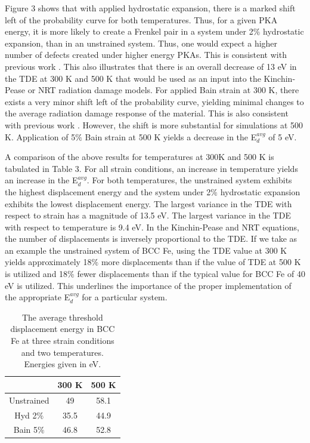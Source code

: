 \documentclass[review]{elsarticle}
\begin{document}
Figure 3 shows that with applied hydrostatic expansion, there is a marked shift left of the probability curve for both temperatures.  Thus, for a given PKA energy, it is more likely to create a Frenkel pair in a system under 2$\%$ hydrostatic expansion, than in an unstrained system.  Thus, one would expect a higher number of defects created under higher energy PKAs.  This is consistent with previous work \cite{beeler2015}.  This also illustrates that there is an overall decrease of 13 eV in the TDE at 300 K and 500 K that would be used as an input into the Kinchin-Pease or NRT radiation damage models.  For applied Bain strain at 300 K, there exists a very minor shift left of the probability curve, yielding minimal changes to the average radiation damage response of the material.  This is also consistent with previous work \cite{beeler2015}.  However, the shift is more substantial for simulations at 500 K.  Application of 5$\%$ Bain strain at 500 K yields a decrease in the E$^{avg}_{d}$ of 5 eV.

\FloatBarrier

A comparison of the above results for temperatures at 300K and 500 K is tabulated in Table 3.  For all strain conditions, an increase in temperature yields an increase in the E$^{avg}_{d}$.  For both temperatures, the unstrained system exhibits the highest displacement energy and the system under 2$\%$ hydrostatic expansion exhibits the lowest displacement energy.  The largest variance in the TDE with respect to strain has a magnitude of 13.5 eV.  The largest variance in the TDE with respect to temperature is 9.4 eV.  In the Kinchin-Pease and NRT equations, the number of displacements is inversely proportional to the TDE.  If we take as an example the unstrained system of BCC Fe, using the TDE value at 300 K yields approximately 18$\%$ more displacements than if the value of TDE at 500 K is utilized and 18$\%$ fewer displacements than if the typical value for BCC Fe of 40 eV is utilized.  This underlines the importance of the proper implementation of the appropriate E$^{avg}_{d}$ for a particular system.  

\begin{table}[htbp]
\caption{The average threshold displacement energy in BCC Fe at three strain conditions and two temperatures.  Energies given in eV.}
\begin{center}
\begin{tabular}{|c|c|c|}
	\hline
	& 300 K & 500 K \\
	 \hline
	 Unstrained & 49 & 58.1 \\
	 Hyd 2$\%$ & 35.5 & 44.9 \\
	 Bain 5$\%$ & 46.8 & 52.8 \\
	 \hline
\end{tabular}
\end{center}
\label{default}
\end{table}
\end{document}
